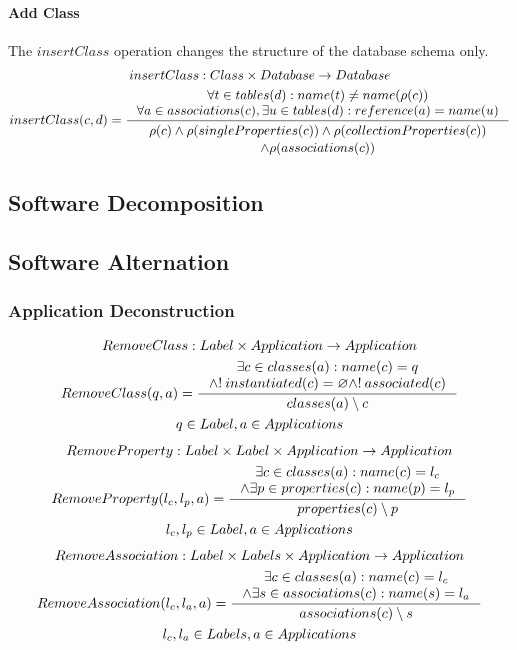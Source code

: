 \documentclass[11pt]{article}
\begin{document}
\paragraph{Add Class} The $insertClass$ operation changes the structure of the database schema only.
\begin{gather*}
insertClass : Class \times Database \rightarrow Database \\
insertClass(c, d) = \inference{ \forall t \in tables(d) : name(t) \neq name(\rho(c)) \\
	\forall a \in associations(c), \exists u \in  tables(d) : reference(a) = name(u) 
}{
\begin{gathered}
  \rho(c) \wedge \rho(singleProperties(c)) \wedge \rho(collectionProperties(c)) \\ \wedge \rho(associations(c))
\end{gathered}
}
\end{gather*}



\subsection{Software Decomposition}
\subsection{Software Alternation}

\subsubsection{Application Deconstruction}
\begin{gather*}
RemoveClass: Label \times Application \rightarrow Application  \\
RemoveClass(q, a) = \inference{\exists c \in classes(a) : name(c) = q \\
\wedge !\: instantiated(c) = \varnothing \wedge !\: associated(c)} {classes(a) \setminus c } \\
q \in Label, a \in Applications
\end{gather*}
\begin{gather*}
RemoveProperty: Label \times Label \times Application \rightarrow Application \\
RemoveProperty(l_c, l_p, a) = \inference{\exists c \in classes(a) : name(c) = l_c \\ \wedge \exists p \in properties(c) : name(p) = l_p}{properties(c) \setminus p }\\
l_c, l_p \in Label, a \in Applications 
\end{gather*}
\begin{gather*}
RemoveAssociation : Label \times Labels \times Application \rightarrow Application \\ 
RemoveAssociation(l_c, l_a, a) = \inference{\exists c \in classes(a) : name(c) = l_c \\ \wedge \exists s \in associations(c) : name(s) = l_a }{associations(c) \setminus s} \\
l_c, l_a \in Labels, a \in Applications
\end{gather*}
\end{document}
